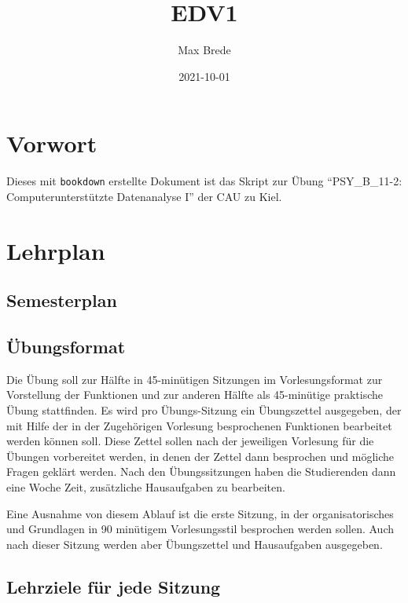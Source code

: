 \documentclass[
]{book}
\title{EDV1}
\author{Max Brede}
\date{2021-10-01}
\begin{document}
\maketitle

{
\setcounter{tocdepth}{1}
\tableofcontents
}
\hypertarget{vorwort}{%
\chapter{Vorwort}\label{vorwort}}

Dieses mit \texttt{bookdown} erstellte Dokument ist das Skript zur Übung ``PSY\_B\_11-2: Computerunterstützte Datenanalyse I'' der CAU zu Kiel.

\hypertarget{lehrplan}{%
\chapter{Lehrplan}\label{lehrplan}}

\hypertarget{semesterplan}{%
\section{Semesterplan}\label{semesterplan}}

\hypertarget{uxfcbungsformat}{%
\section{Übungsformat}\label{uxfcbungsformat}}

Die Übung soll zur Hälfte in 45-minütigen Sitzungen im Vorlesungsformat zur Vorstellung der Funktionen und zur anderen Hälfte als 45-minütige praktische Übung stattfinden.
Es wird pro Übungs-Sitzung ein Übungszettel ausgegeben, der mit Hilfe der in der Zugehörigen Vorlesung besprochenen Funktionen bearbeitet werden können soll.
Diese Zettel sollen nach der jeweiligen Vorlesung für die Übungen vorbereitet werden, in denen der Zettel dann besprochen und mögliche Fragen geklärt werden.
Nach den Übungssitzungen haben die Studierenden dann eine Woche Zeit, zusätzliche Hausaufgaben zu bearbeiten.

Eine Ausnahme von diesem Ablauf ist die erste Sitzung, in der organisatorisches und Grundlagen in 90 minütigem Vorlesungsstil besprochen werden sollen. Auch nach dieser Sitzung werden aber Übungszettel und Hausaufgaben ausgegeben.

\hypertarget{lehrziele-fuxfcr-jede-sitzung}{%
\section{Lehrziele für jede Sitzung}\label{lehrziele-fuxfcr-jede-sitzung}}
\end{document}
